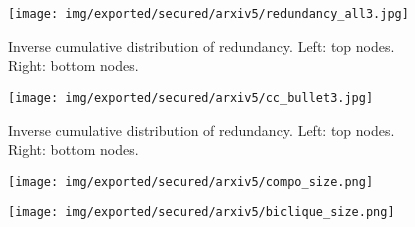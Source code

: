 \documentclass[table]{report}
\begin{document}
\begin{figure}[h]%
\centering
\texttt{[image: img/exported/secured/arxiv5/redundancy\_all3.jpg]}
\caption{Inverse cumulative distribution of redundancy. Left: top nodes. Right: bottom nodes.}
\label{fig:redundancy_all}
\end{figure}
\FloatBarrier


\begin{figure}[h]%
\centering
\texttt{[image: img/exported/secured/arxiv5/cc\_bullet3.jpg]}
\caption{Inverse cumulative distribution of redundancy. Left: top nodes. Right: bottom nodes.}
\label{fig:redundancy_all}
\end{figure}
\FloatBarrier


%
%
%
%
%



\begin{figure}[h]%
\centering
\texttt{[image: img/exported/secured/arxiv5/compo\_size.png]}
\caption{}
\label{fig:compo_size}
\end{figure}
\FloatBarrier


\begin{figure}[h]%
\centering
\texttt{[image: img/exported/secured/arxiv5/biclique\_size.png]}
\caption{}
\label{fig:biclique_size}
\end{figure}
\FloatBarrier
%
%
%
%
%
%
\end{document}
